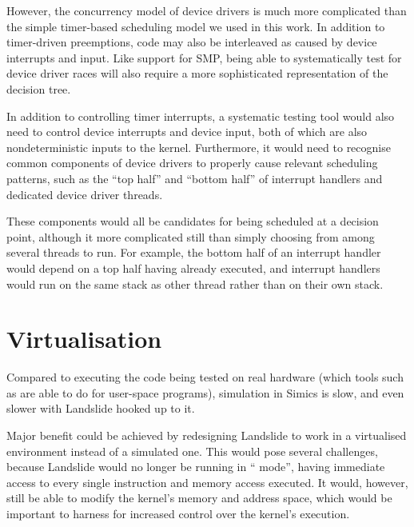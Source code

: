 However, the concurrency model of device drivers is much more complicated than the simple timer-based scheduling model we used in this work. In addition to timer-driven preemptions, code may also be interleaved as caused by device interrupts and input. Like support for SMP, being able to systematically test for device driver races will also require a more sophisticated representation of the decision tree.

In addition to controlling timer interrupts, a systematic testing tool would also need to control device interrupts and device input, both of which are also nondeterministic inputs to the kernel.
Furthermore, it would need to recognise common components of device drivers to properly cause relevant scheduling patterns, such as the ``top half'' and ``bottom half'' of interrupt handlers and dedicated device driver threads.

These components would all be candidates for being scheduled at a decision point, although it more complicated still than simply choosing from among several threads to run. For example, the bottom half of an interrupt handler would depend on a top half having already executed, and interrupt handlers would run on the same stack as other thread rather than on their own stack.


\section{Virtualisation}
\label{sec:future-virt}

Compared to executing the code being tested on real hardware (which tools such as \cite{dbug-ssv} are able to do for user-space programs), simulation in Simics is slow, and even slower with Landslide hooked up to it.

Major benefit could be achieved by redesigning Landslide to work in a virtualised environment instead of a simulated one. This would pose several challenges, because Landslide would no longer be running in `` mode'', having immediate access to every single instruction and memory access executed. It would, however, still be able to modify the kernel's memory and address space, which would be important to harness for increased control over the kernel's execution.

